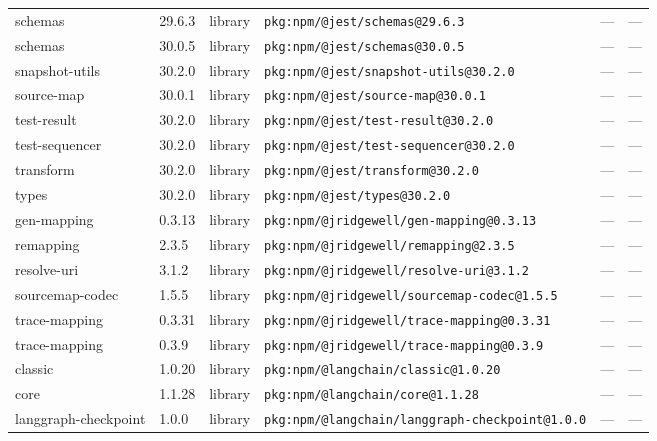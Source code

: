 \documentclass[11pt,a4paper]{article}
\begin{document}
\begin{longtable}{|p{4cm}|p{2cm}|p{1.6cm}|p{5cm}|p{1.5cm}|p{3.5cm}|}
\raggedright schemas & 29.6.3 & library & \small\texttt{pkg:npm/@jest/schemas@29.6.3} & — & \small — \\
\raggedright schemas & 30.0.5 & library & \small\texttt{pkg:npm/@jest/schemas@30.0.5} & — & \small — \\
\raggedright snapshot-utils & 30.2.0 & library & \small\texttt{pkg:npm/@jest/snapshot-utils@30.2.0} & — & \small — \\
\raggedright source-map & 30.0.1 & library & \small\texttt{pkg:npm/@jest/source-map@30.0.1} & — & \small — \\
\raggedright test-result & 30.2.0 & library & \small\texttt{pkg:npm/@jest/test-result@30.2.0} & — & \small — \\
\raggedright test-sequencer & 30.2.0 & library & \small\texttt{pkg:npm/@jest/test-sequencer@30.2.0} & — & \small — \\
\raggedright transform & 30.2.0 & library & \small\texttt{pkg:npm/@jest/transform@30.2.0} & — & \small — \\
\raggedright types & 30.2.0 & library & \small\texttt{pkg:npm/@jest/types@30.2.0} & — & \small — \\
\raggedright gen-mapping & 0.3.13 & library & \small\texttt{pkg:npm/@jridgewell/gen-mapping@0.3.13} & — & \small — \\
\raggedright remapping & 2.3.5 & library & \small\texttt{pkg:npm/@jridgewell/remapping@2.3.5} & — & \small — \\
\raggedright resolve-uri & 3.1.2 & library & \small\texttt{pkg:npm/@jridgewell/resolve-uri@3.1.2} & — & \small — \\
\raggedright sourcemap-codec & 1.5.5 & library & \small\texttt{pkg:npm/@jridgewell/sourcemap-codec@1.5.5} & — & \small — \\
\raggedright trace-mapping & 0.3.31 & library & \small\texttt{pkg:npm/@jridgewell/trace-mapping@0.3.31} & — & \small — \\
\raggedright trace-mapping & 0.3.9 & library & \small\texttt{pkg:npm/@jridgewell/trace-mapping@0.3.9} & — & \small — \\
\raggedright classic & 1.0.20 & library & \small\texttt{pkg:npm/@langchain/classic@1.0.20} & — & \small — \\
\raggedright core & 1.1.28 & library & \small\texttt{pkg:npm/@langchain/core@1.1.28} & — & \small — \\
\raggedright langgraph-checkpoint & 1.0.0 & library & \small\texttt{pkg:npm/@langchain/langgraph-checkpoint@1.0.0} & — & \small — \\

\end{longtable}
\end{document}
